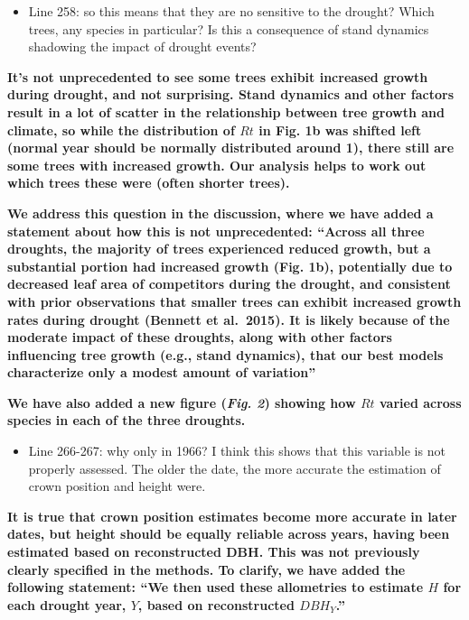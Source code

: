 \documentclass[
]{article}
\providecommand{\tightlist}{%
  \setlength{\itemsep}{0pt}\setlength{\parskip}{0pt}}
\begin{document}
\begin{itemize}
\tightlist
\item
  Line 258: so this means that they are no sensitive to the drought?
  Which trees, any species in particular? Is this a consequence of stand
  dynamics shadowing the impact of drought events?
\end{itemize}

\textbf{It's not unprecedented to see some trees exhibit increased
growth during drought, and not surprising. Stand dynamics and other
factors result in a lot of scatter in the relationship between tree
growth and climate, so while the distribution of \(Rt\) in Fig. 1b was
shifted left (normal year should be normally distributed around 1),
there still are some trees with increased growth. Our analysis helps to
work out which trees these were (often shorter trees).}

\textbf{We address this question in the discussion, where we have added
a statement about how this is not unprecedented: ``Across all three
droughts, the majority of trees experienced reduced growth, but a
substantial portion had increased growth (Fig. 1b), potentially due to
decreased leaf area of competitors during the drought, and consistent
with prior observations that smaller trees can exhibit increased growth
rates during drought (Bennett et al.~2015). It is likely because of the
moderate impact of these droughts, along with other factors influencing
tree growth (e.g., stand dynamics), that our best models characterize
only a modest amount of variation''}

\textbf{We have also added a new figure (\emph{Fig. 2}) showing how
\(Rt\) varied across species in each of the three droughts.}

\begin{itemize}
\tightlist
\item
  Line 266-267: why only in 1966? I think this shows that this variable
  is not properly assessed. The older the date, the more accurate the
  estimation of crown position and height were.
\end{itemize}

\textbf{It is true that crown position estimates become more accurate in
later dates, but height should be equally reliable across years, having
been estimated based on reconstructed DBH. This was not previously
clearly specified in the methods. To clarify, we have added the
following statement: ``We then used these allometries to estimate \(H\)
for each drought year, \(Y\), based on reconstructed \(DBH_Y\).''}
\end{document}
